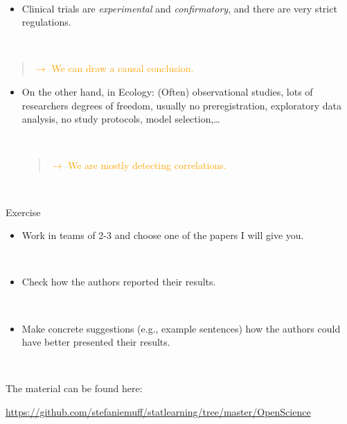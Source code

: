 \documentclass[
  10pt,
  ignorenonframetext,
]{beamer}
\providecommand{\tightlist}{%
  \setlength{\itemsep}{0pt}\setlength{\parskip}{0pt}}
\begin{document}
\begin{frame}
\(~\)

\begin{itemize}
\tightlist
\item
  Clinical trials are \emph{experimental} and \emph{confirmatory}, and
  there are very strict regulations.
\end{itemize}

\(~\)

\begin{quote}
\textcolor{orange}{$\rightarrow$ We can draw a causal conclusion.}
\end{quote}

\vspace{4mm}

\begin{itemize}
\item
  On the other hand, in Ecology: (Often) observational studies, lots of
  researchers degrees of freedom, usually no preregistration,
  exploratory data analysis, no study protocols, model
  selection,\ldots{}

  \(~\)

  \begin{quote}
  \textcolor{orange}{$\rightarrow$ We are mostly detecting correlations.}
  \end{quote}
\end{itemize}

\(~\)
\end{frame}

\begin{frame}{Exercise}
\protect\hypertarget{exercise}{}
\(~\)

\begin{itemize}
\tightlist
\item
  Work in teams of 2-3 and choose one of the papers I will give you.
\end{itemize}

\(~\)

\begin{itemize}
\tightlist
\item
  Check how the authors reported their results.
\end{itemize}

\(~\)

\begin{itemize}
\tightlist
\item
  Make concrete suggestions (e.g., example sentences) how the authors
  could have better presented their results.
\end{itemize}

\(~\)

The material can be found here:

\url{https://github.com/stefaniemuff/statlearning/tree/master/OpenScience}
\end{frame}
\end{document}
